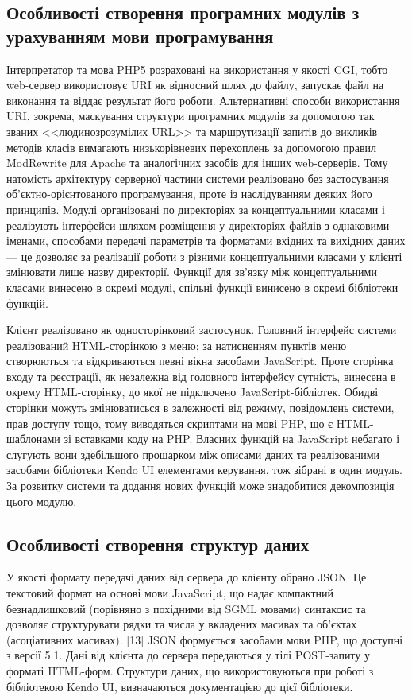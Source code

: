 \subsection{Особливості створення програмних модулів з урахуванням мови програмування}
\bigbreak
\begin{sloppy}
Інтерпретатор та мова PHP5 розраховані на використання у якості CGI, тобто web-сервер використовує URI як відносний шлях до файлу, запускає файл на виконання та віддає результат його роботи. Альтернативні способи використання URI, зокрема, маскування структури програмних модулів за допомогою так званих <<людинозрозумілих URL>> та маршрутизації запитів до викликів методів класів вимагають низькорівневих перехоплень за допомогою правил ModRewrite для Apache та аналогічних засобів для інших web-серверів. Тому натомість архітектуру серверної частини системи реалізовано без застосування об'єктно-орієнтованого програмування, проте із наслідуванням деяких його принципів. Модулі організовані по директоріях за концептуальними класами і реалізують інтерфейси шляхом розміщення у директоріях файлів з однаковими іменами, способами передачі параметрів та форматами вхідних та вихідних даних --- це дозволяє за реалізації роботи з різними концептуальними класами у клієнті змінювати лише назву директорії. Функції для зв'язку між концептуальними класами винесено в окремі модулі, спільні функції винисено в окремі бібліотеки функцій.

Клієнт реалізовано як односторінковий застосунок. Головний інтерфейс системи реалізований HTML-сторінкою з меню; за натисненням пунктів меню створюються та відкриваються певні вікна засобами JavaScript. Проте сторінка входу та реєстрації, як незалежна від головного інтерфейсу сутність, винесена в окрему HTML-сторінку, до якої не підключено JavaScript-бібліотек. Обидві сторінки можуть змінюватисься в залежності від режиму, повідомлень системи, прав доступу тощо, тому виводяться скриптами на мові PHP, що є HTML-шаблонами зі вставками коду на PHP. Власних функцій на JavaScript небагато і слугують вони здебільшого прошарком між описами даних та реалізованими засобами бібліотеки Kendo UI елементами керування, тож зібрані в один модуль. За розвитку системи та додання нових функцій може знадобитися декомпозиція цього модулю.
\end{sloppy}
\bigbreak
\subsection{Особливості створення структур даних}
\bigbreak
У якості формату передачі даних від сервера до клієнту обрано JSON. Це текстовий формат на основі мови JavaScript, що надає компактний безнадлишковий (порівняно з похідними від SGML мовами) синтаксис та дозволяє структурувати рядки та числа у вкладених масивах та об'єктах (асоціативних масивах). [13] JSON формується засобами мови PHP, що доступні з версії 5.1. Дані від клієнта до сервера передаються у тілі POST-запиту у форматі HTML-форм. Структури даних, що використовуються при роботі з бібліотекою Kendo UI, визначаються документацією до цієї бібліотеки.
